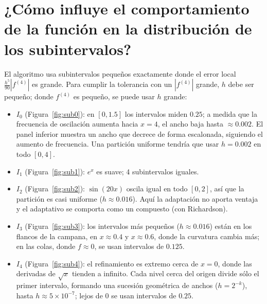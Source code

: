 \documentclass[11pt,letterpaper]{report}
\begin{document}
\section{¿Cómo influye el comportamiento de la función en la distribución de los subintervalos?}
El algoritmo usa subintervalos pequeños exactamente donde el error local
$\frac{h^5}{90}|f^{(4)}|$ es grande. Para cumplir la tolerancia con un $|f^{(4)}|$ grande, $h$ debe
ser pequeño; donde $f^{(4)}$ es pequeño, se puede usar $h$ grande:
\begin{itemize}
  \item \textbf{$I_0$} (Figura~\ref{fig:sub0}): en $[0,1.5]$ los intervalos miden $0.25$; a medida que la
        frecuencia de oscilación aumenta hacia $x=4$, el ancho baja hasta $\approx0.002$. El panel
        inferior muestra un ancho que decrece de forma escalonada, siguiendo el aumento de
        frecuencia. Una partición uniforme tendría que usar $h=0.002$ en todo $[0,4]$.
  \item \textbf{$I_1$} (Figura~\ref{fig:sub1}): $e^x$ es suave; 4 subintervalos iguales.
  \item \textbf{$I_2$} (Figura~\ref{fig:sub2}): $\sin(20x)$ oscila igual en todo $[0,2]$, así que la
        partición es casi uniforme ($h\approx0.016$). Aquí la adaptación no aporta ventaja y el
        adaptativo se comporta como un compuesto (con Richardson).
  \item \textbf{$I_3$} (Figura~\ref{fig:sub3}): los intervalos más pequeños ($h\approx0.016$) están en los
        flancos de la campana, en $x\approx0.4$ y $x\approx0.6$, donde la curvatura cambia más; en las
        colas, donde $f\approx0$, se usan intervalos de $0.125$.
  \item \textbf{$I_4$} (Figura~\ref{fig:sub4}): el refinamiento es extremo cerca de $x=0$, donde las
        derivadas de $\sqrt{x}$ tienden a infinito. Cada nivel cerca del origen divide sólo el
        primer intervalo, formando una sucesión geométrica de anchos ($h=2^{-k}$), hasta
        $h\approx5\times10^{-7}$; lejos de 0 se usan intervalos de $0.25$.
\end{itemize}
\end{document}
